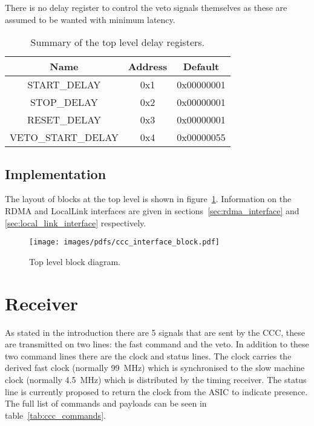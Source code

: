 \documentclass[]{article}
\begin{document}
    There is no delay register to control the veto signals themselves as these are assumed to be wanted with minimum latency.
    
    \begin{table}
        \begin{center}
            \begin{tabular}{c | c | c }
                Name               & Address & Default    \\
                \hline
                START\_DELAY       & 0x1     & 0x00000001 \\
                STOP\_DELAY        & 0x2     & 0x00000001 \\
                RESET\_DELAY       & 0x3     & 0x00000001 \\
                VETO\_START\_DELAY & 0x4     & 0x00000055 \\
            \end{tabular}
        \end{center}
        \caption{Summary of the top level delay registers.}
        \label{tab:delay_regs}
    \end{table}
    \subsection{Implementation} %
    \label{sub:top_implementation}
    The layout of blocks at the top level is shown in figure~\ref{fig:ccc_interface_block}. Information on the RDMA and LocalLink interfaces are given in sections~\ref{sec:rdma_interface} and \ref{sec:local_link_interface} respectively.
    
    \begin{figure}[htbp]
        \centering
            \texttt{[image: images/pdfs/ccc\_interface\_block.pdf]}
        \caption{Top level block diagram.}
        \label{fig:ccc_interface_block}
    \end{figure}
    
    \section{Receiver} %
    \label{sec:receiver}
    As stated in the introduction there are 5 signals that are sent by the CCC, these are transmitted on two lines: the fast command and the veto. In addition to these two command lines there are the clock and status lines. The clock carries the derived fast clock (normally 99~MHz) which is synchronised to the slow machine clock (normally 4.5~MHz) which is distributed by the timing receiver. The status line is currently proposed to return the clock from the ASIC to indicate presence. The full list of commands and payloads can be seen in table~\ref{tab:ccc_commands}.
  
\end{document}
